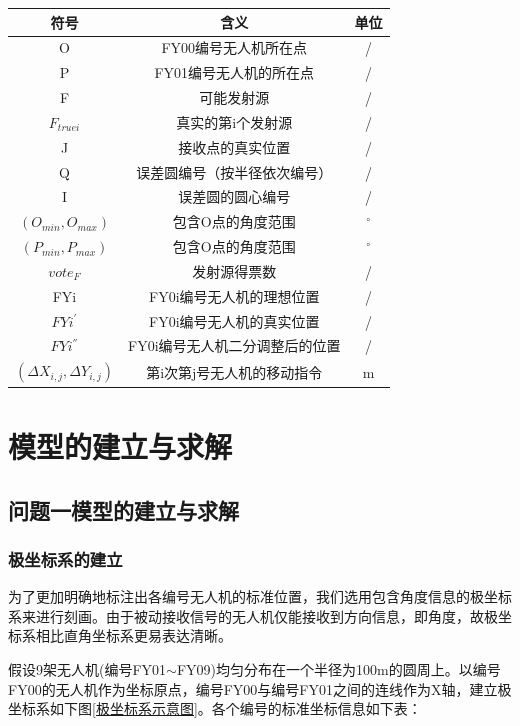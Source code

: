 \documentclass{ctexart}
\begin{document}
\begin{table}[H]
  \centering
  \begin{tabular}{ccc}
  \toprule
  符号& 含义& 单位\\
  \midrule
  O&FY00编号无人机所在点&/\\
  P&FY01编号无人机的所在点&/\\
  F&可能发射源&/\\
  $F_{truei}$&真实的第i个发射源&/\\
  J&接收点的真实位置&/\\
  Q&误差圆编号（按半径依次编号）&/\\
  I&误差圆的圆心编号&/\\
  $(O_{min},O_{max})$&包含O点的角度范围&$^{\circ}$\\
  $(P_{min},P_{max})$&包含O点的角度范围&$^{\circ}$\\
  $vote_F$&发射源得票数&/\\
  FYi&FY0i编号无人机的理想位置&/\\
  $FYi^{'}$&FY0i编号无人机的真实位置&/\\
  $FYi^{''}$&FY0i编号无人机二分调整后的位置&/\\
  $(\Delta X_{i,j},\Delta Y_{i,j})$&第i次第j号无人机的移动指令&m\\
  \bottomrule
  \end{tabular}
  \end{table}




\section{模型的建立与求解}

\subsection{问题一模型的建立与求解}

\subsubsection{极坐标系的建立}

为了更加明确地标注出各编号无人机的标准位置，我们选用包含角度信息的极坐标系来进行刻画。由于被动接收信号的无人机仅能接收到方向信息，即角度，故极坐标系相比直角坐标系更易表达清晰。

假设9架无人机(编号FY01$\sim$FY09)均匀分布在一个半径为100m的圆周上。以编号FY00的无人机作为坐标原点，编号FY00与编号FY01之间的连线作为X轴，建立极坐标系如下图\ref{极坐标系示意图}。各个编号的标准坐标信息如下表：
\end{document}
